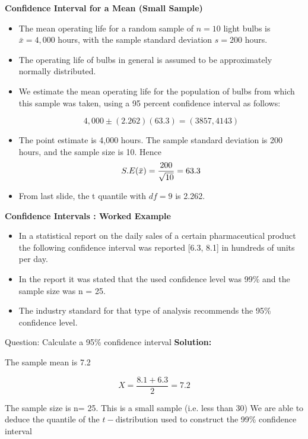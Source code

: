 \item \textbf{Confidence Interval for a Mean (Small Sample)} \\
\begin{itemize}
\item The mean operating life for a random sample of $n = 10$ light bulbs is $\bar{x} = 4,000$ hours, with the sample
standard deviation $s = 200$ hours. 

\item The operating life of bulbs in general is assumed to be approximately normally distributed.
\item We estimate the mean operating life for the population of bulbs from which this sample was taken, using a 95 percent confidence interval as follows:

\[4,000\pm(2.262)(63.3)  = (3857,4143)\]

\item The point estimate is 4,000 hours. The sample standard deviation is 200 hours, and the sample size is 10. Hence
\[S.E(\bar{x} ) = { 200 \over \sqrt{10}} = 63.3\]

\item From last slide, the t quantile with $df=9$ is 2.262.
\end{itemize}

\item \textbf{Confidence Intervals : Worked Example}\\

\begin{itemize} 
\item In a statistical report on the daily sales of a certain pharmaceutical product the following confidence interval was reported [6.3, 8.1] in hundreds of units per day.

\item In the report it was stated that the used confidence level was 99\% and the sample size was n = 25. 
\item The industry standard for that type of analysis recommends the 95\% confidence level.
\end{itemize}
Question: Calculate a 95\% confidence interval
\textbf{Solution:}

The sample mean is 7.2

\[X=\frac{8.1 + 6.3}{2}=7.2\]

The sample size is n= 25. This is a small sample (i.e. less than 30)
We are able to deduce the quantile of the $t-$distribution used to construct the 99\% confidence interval

